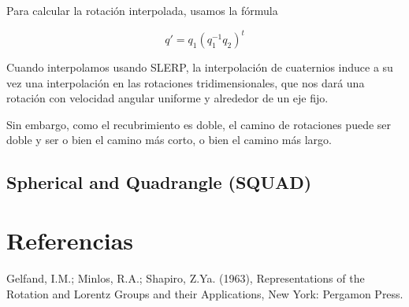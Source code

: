 \documentclass{article}
\theoremstyle{plain}
\theoremstyle{definition}
\theoremstyle{remark}
\begin{document}
Para calcular la rotación interpolada, usamos la fórmula

\[q' = q_1(q_1^{-1}q_2)^t\]

Cuando interpolamos usando SLERP, la interpolación de cuaternios induce a
su vez una interpolación en las rotaciones tridimensionales, que nos dará
una rotación con velocidad angular uniforme y alrededor de un eje fijo.

Sin embargo, como el recubrimiento es doble, el camino de rotaciones puede
ser doble y ser o bien el camino más corto, o bien el camino más largo.


\subsection{Spherical and Quadrangle (SQUAD)}

\section{Referencias}

\begin{thebibliography}{9}

  Gelfand, I.M.; Minlos, R.A.; Shapiro, Z.Ya. (1963),
  Representations of the Rotation and Lorentz Groups and their Applications,
  New York: Pergamon Press.

\end{thebibliography}
\end{document}
